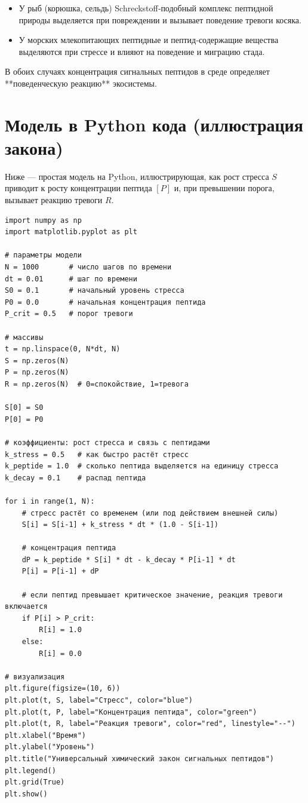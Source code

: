 \documentclass[12pt]{article}
\begin{document}
\begin{itemize}
  \item У рыб (корюшка, сельдь) Schreckstoff‑подобный комплекс пептидной природы выделяется при повреждении и вызывает поведение тревоги косяка.
  \item У морских млекопитающих пептидные и пептид‑содержащие вещества выделяются при стрессе и влияют на поведение и миграцию стада.
\end{itemize}

В обоих случаях концентрация сигнальных пептидов в среде определяет **поведенческую реакцию** экосистемы.

\section{Модель в Python кода (иллюстрация закона)}

Ниже — простая модель на Python, иллюстрирующая, как рост стресса $S$ приводит к росту концентрации пептида $[P]$ и, при превышении порога, вызывает реакцию тревоги $R$.


\begin{lstlisting}
import numpy as np
import matplotlib.pyplot as plt

# параметры модели
N = 1000       # число шагов по времени
dt = 0.01      # шаг по времени
S0 = 0.1       # начальный уровень стресса
P0 = 0.0       # начальная концентрация пептида
P_crit = 0.5   # порог тревоги

# массивы
t = np.linspace(0, N*dt, N)
S = np.zeros(N)
P = np.zeros(N)
R = np.zeros(N)  # 0=спокойствие, 1=тревога

S[0] = S0
P[0] = P0

# коэффициенты: рост стресса и связь с пептидами
k_stress = 0.5   # как быстро растёт стресс
k_peptide = 1.0  # сколько пептида выделяется на единицу стресса
k_decay = 0.1    # распад пептида

for i in range(1, N):
    # стресс растёт со временем (или под действием внешней силы)
    S[i] = S[i-1] + k_stress * dt * (1.0 - S[i-1])

    # концентрация пептида
    dP = k_peptide * S[i] * dt - k_decay * P[i-1] * dt
    P[i] = P[i-1] + dP

    # если пептид превышает критическое значение, реакция тревоги включается
    if P[i] > P_crit:
        R[i] = 1.0
    else:
        R[i] = 0.0

# визуализация
plt.figure(figsize=(10, 6))
plt.plot(t, S, label="Стресс", color="blue")
plt.plot(t, P, label="Концентрация пептида", color="green")
plt.plot(t, R, label="Реакция тревоги", color="red", linestyle="--")
plt.xlabel("Время")
plt.ylabel("Уровень")
plt.title("Универсальный химический закон сигнальных пептидов")
plt.legend()
plt.grid(True)
plt.show()
\end{lstlisting}
\end{document}
